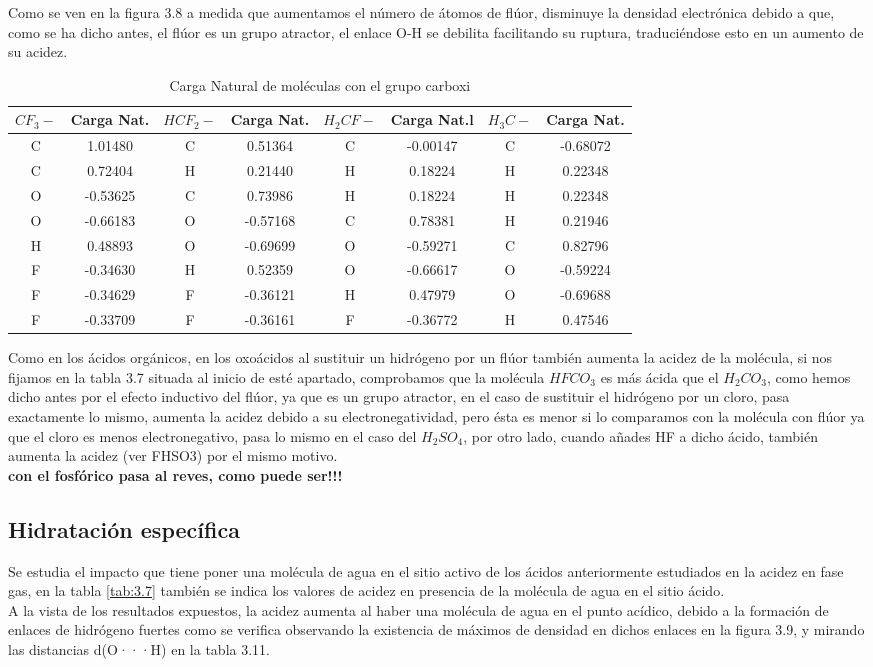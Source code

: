 Como se ven en la figura 3.8 a medida que aumentamos el número de átomos de flúor, disminuye la densidad electrónica debido a que, como se ha dicho antes, el flúor es un grupo atractor, el enlace O-H se debilita facilitando su ruptura, traduciéndose esto en un aumento de su acidez.
\begin{table}[H]
    \centering
    \begin{tabular}{|c|c|c|c|c|c|c|c|}
    \hline
    $CF_3-$ & Carga Nat. & $HCF_2-$ & Carga Nat. & $H_2CF-$ & Carga Nat.l  & $H_3C-$ & Carga Nat. \\ \hline
     C & 1.01480 &  C & 0.51364 & C & -0.00147 & C & -0.68072 \\ \hline
     C & 0.72404 &  H & 0.21440 & H & 0.18224 & H & 0.22348 \\ \hline
     O & -0.53625 & C & 0.73986 & H & 0.18224 & H & 0.22348 \\ \hline
     O & -0.66183 & O & -0.57168 & C & 0.78381 & H & 0.21946 \\ \hline
     H & 0.48893 & O & -0.69699 & O & -0.59271 & C & 0.82796 \\ \hline
     F & -0.34630 & H & 0.52359 & O & -0.66617 & O & -0.59224 \\ \hline
     F & -0.34629 & F & -0.36121 & H & 0.47979 & O & -0.69688 \\ \hline
     F & -0.33709 & F & -0.36161 & F & -0.36772 & H & 0.47546 \\ \hline
    \end{tabular}
    \caption{Carga Natural de moléculas con el grupo carboxi}
\end{table}

Como en los ácidos orgánicos, en los oxoácidos al sustituir un hidrógeno por un flúor también aumenta la acidez de la molécula, si nos fijamos en la tabla 3.7 situada al inicio de esté apartado, comprobamos que la molécula $HFCO_3$ es más ácida que el $H_2CO_3$, como hemos dicho antes por el efecto inductivo del flúor, ya que es un grupo atractor, en el caso de sustituir el hidrógeno por un cloro, pasa exactamente lo mismo, aumenta la acidez debido a su electronegatividad, pero ésta es menor si lo comparamos con la molécula con flúor ya que el cloro es menos electronegativo, pasa lo mismo en el caso del $H_2SO_4$, por otro lado, cuando añades HF a dicho ácido, también aumenta la acidez (ver FHSO3) por el mismo motivo.\\
{\bfseries con el fosfórico pasa al reves, como puede ser!!! }
\subsection{Hidratación específica}
Se estudia el impacto que tiene poner una molécula de agua en el sitio activo de los ácidos anteriormente estudiados en la acidez en fase gas, en la tabla \ref{tab:3.7} también se indica los valores de acidez en presencia de la molécula de agua en el sitio ácido.\\
A la vista de los resultados expuestos, la acidez aumenta al haber una molécula de agua en el punto acídico, debido a la formación de enlaces de hidrógeno fuertes como se verifica observando la existencia de máximos de densidad en dichos enlaces en la figura 3.9, y mirando las distancias d(O···H)  en la tabla 3.11.

